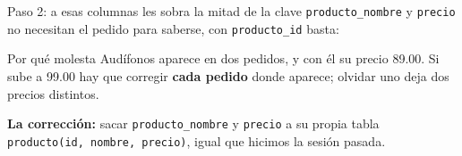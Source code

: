 \documentclass[aspectratio=169,10pt,c]{beamer}
\newcommand{\tbl}[1]{\textcolor{utpNaranja}{\texttt{#1}}}
\begin{document}
\begin{frame}{Paso 2: a esas columnas les sobra la mitad de la clave}
\small \texttt{producto\_nombre} y \texttt{precio} no necesitan el pedido para saberse, con \texttt{producto\_id} basta:
\vspace{0.2cm}
\begin{center}
\end{center}
\vspace{0.15cm}
\begin{alertblock}{Por qué molesta}
\small Audífonos aparece en dos pedidos, y con él su precio 89.00. Si sube a 99.00 hay que corregir \textbf{cada pedido} donde aparece; olvidar uno deja dos precios distintos.
\end{alertblock}
\vspace{0.15cm}
\small \textbf{La corrección:} sacar \texttt{producto\_nombre} y \texttt{precio} a su propia tabla \tbl{producto}\texttt{(id, nombre, precio)}, igual que hicimos la sesión pasada.
\end{frame}
\end{document}
